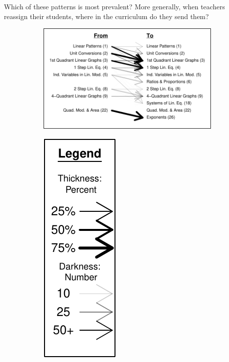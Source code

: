 \documentclass[12pt]{article}\usepackage[]{graphicx}\usepackage[]{color}
\makeatletter
\def\maxwidth{ %
  \ifdim\Gin@nat@width>\linewidth
    \linewidth
  \else
    \Gin@nat@width
  \fi
}
\makeatother
\begin{document}
Which of these patterns is most prevalent?
More generally, when teachers reassign their students, where in the
curriculum do they send them?







\begin{figure}
  \centering
  \begin{subfigure}{5in}

\includegraphics[width=\maxwidth]{figure/transition1-1} 

\end{subfigure}
\begin{subfigure}{1in}
  \centering

\includegraphics[width=\maxwidth]{figure/trans1legend-1} 


\end{subfigure}
\end{figure}
\end{document}

